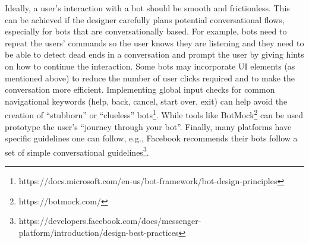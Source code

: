 \documentclass{sig-alternate}
\begin{document}
	Ideally, a user's interaction with a bot should be smooth and frictionless. 
	This can be achieved if the designer carefully plans potential conversational flows, especially for bots that are conversationally based.  For example, bots need to repeat the users' commands so the user knows they are listening and they need to be able to detect dead ends in a conversation and prompt the user by giving hints on how to continue the interaction. Some bots may incorporate UI elements (as mentioned above) to reduce the number of user clicks required and to make the conversation more efficient. 
	Implementing global input checks for common navigational keywords (help, back, cancel, start over, exit) can help avoid the creation of ``stubborn'' or ``clueless'' bots\footnote{https://docs.microsoft.com/en-us/bot-framework/bot-design-principles}.
	While tools like BotMock\footnote{https://botmock.com/} can be used prototype the user's ``journey through your bot''. 
%
%
	Finally, many platforms have specific guidelines one can follow, e.g., Facebook recommends their bots follow a set of simple conversational guidelines\footnote{https://developers.facebook.com/docs/messenger-platform/introduction/design-best-practices}. 
\end{document}
